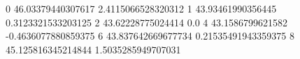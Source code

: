 0 46.03379440307617 2.4115066528320312
1 43.93461990356445 0.3123321533203125
2 43.62228775024414 0.0
4 43.1586799621582 -0.4636077880859375
6 43.837642669677734 0.21535491943359375
8 45.125816345214844 1.5035285949707031

